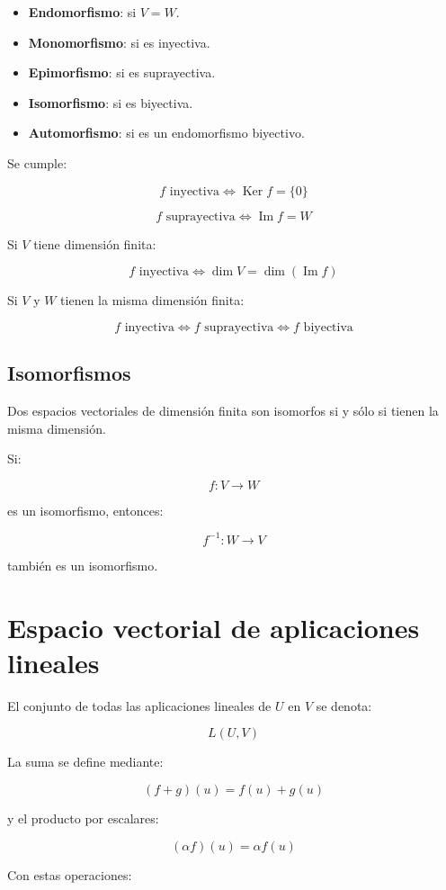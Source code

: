 \documentclass[11pt,a4paper]{article}
\newcommand{\Ker}{\operatorname{Ker}}
\newcommand{\Ima}{\operatorname{Im}}
\begin{document}
\begin{itemize}
	\item \textbf{Endomorfismo}: si $V=W$.
	\item \textbf{Monomorfismo}: si es inyectiva.
	\item \textbf{Epimorfismo}: si es suprayectiva.
	\item \textbf{Isomorfismo}: si es biyectiva.
	\item \textbf{Automorfismo}: si es un endomorfismo biyectivo.
\end{itemize}

Se cumple:

\[
f\text{ inyectiva}
\iff
\Ker f=\{0\}
\]

\[
f\text{ suprayectiva}
\iff
\Ima f=W
\]

Si $V$ tiene dimensión finita:

\[
f\text{ inyectiva}
\iff
\dim V=\dim(\Ima f)
\]

Si $V$ y $W$ tienen la misma dimensión finita:

\[
f\text{ inyectiva}
\iff
f\text{ suprayectiva}
\iff
f\text{ biyectiva}
\]

\subsection{Isomorfismos}

Dos espacios vectoriales de dimensión finita son isomorfos si y sólo si tienen la misma dimensión.

Si:

\[
f:V\longrightarrow W
\]

es un isomorfismo, entonces:

\[
f^{-1}:W\longrightarrow V
\]

también es un isomorfismo.

\section{Espacio vectorial de aplicaciones lineales}

El conjunto de todas las aplicaciones lineales de $U$ en $V$ se denota:

\[
L(U,V)
\]

La suma se define mediante:

\[
(f+g)(u)=f(u)+g(u)
\]

y el producto por escalares:

\[
(\alpha f)(u)=\alpha f(u)
\]

Con estas operaciones:
\end{document}
